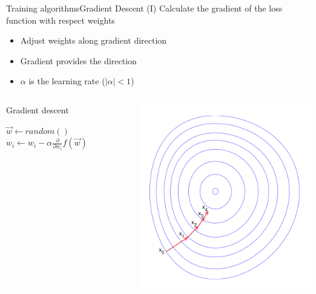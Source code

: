 \documentclass[10pt,compress]{beamer} %
\begin{document}
\begin{frame}[fragile]{Training algorithms}{Gradient Descent (I)}
	Calculate the gradient of the loss function with respect weights
	\begin{itemize}
		\item Adjust weights along gradient direction
		\item Gradient provides the direction
		\item $\alpha$ is the \alert{learning rate} ($|\alpha|<1$)
	\end{itemize}

	\begin{columns}[c]

		\begin{block}{Gradient descent}
		\begin{algorithmic}[1]
		\State $\vec{w} \gets random()$
			\State $w_i \gets w_i - \alpha \frac{\partial}{\partial w_i} f(\vec{w})$
			\EndFor
		\EndWhile
		\end{algorithmic}

		\end{block}


		\includegraphics[width=\linewidth]{figs/descent.png}\\

	\end{columns}
\end{frame}
\end{document}
